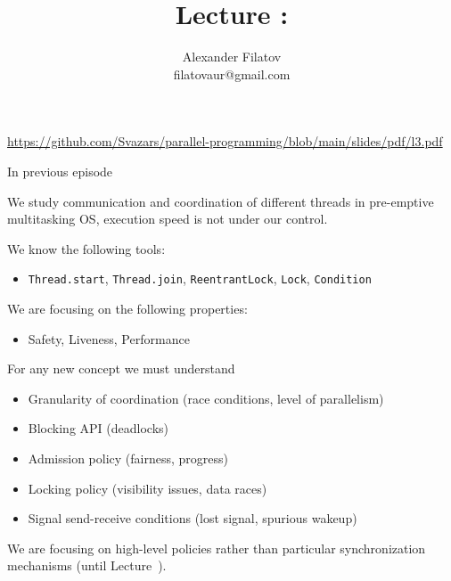 


\title[]{Lecture \syncPrimitivesNum: \syncPrimitivesTopic}
\subtitle[]{\syncPrimitivesKey}
\author[]{Alexander Filatov\\ filatovaur@gmail.com}

\date{}

\newcommand{\taskRewritePhilosophers}{3.1}




\begin{frame}
  \titlepage
  \url{https://github.com/Svazars/parallel-programming/blob/main/slides/pdf/l3.pdf}
\end{frame}

\begin{frame}{In previous episode}

We study communication and coordination of different threads in pre-emptive multitasking OS, execution speed is not under our control.

We know the following tools:
\begin{itemize}
    \item \texttt{Thread.start}, \texttt{Thread.join}, \texttt{ReentrantLock}, \texttt{Lock}, \texttt{Condition}
\end{itemize}

We are focusing on the following properties:
\begin{itemize}
    \item Safety, Liveness, Performance
\end{itemize}

For any new concept we must understand
\begin{itemize}
    \item Granularity of coordination (race conditions, level of parallelism)
    \item Blocking API (deadlocks)
    \item Admission policy (fairness, progress)
    \item Locking policy (visibility issues, data races)
    \item Signal send-receive conditions (lost signal, spurious wakeup)
\end{itemize}

We are focusing on high-level policies rather than particular synchronization mechanisms (until Lecture~\advancedConcurrencyNum).

\end{frame}

